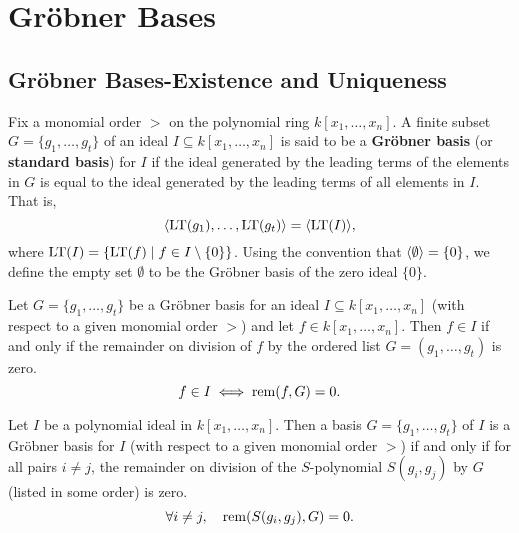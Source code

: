 \chapter{Gr{\"o}bner Bases} 

\section{Gr{\"o}bner Bases-Existence and Uniqueness}

\begin{definition}\label{def:Groebner_basis}
    Fix a monomial order $>$ on the polynomial ring $k[x_1, \dots, x_n]$. A finite subset
    $G = \{g_1, \dots, g_t\}$ of an ideal $I \subseteq k[x_1, \dots, x_n]$ is said to be a
    \textbf{Gr{\"o}bner basis} (or \textbf{standard basis}) for $I$ if the ideal generated by the
    leading terms of the elements in $G$ is equal to the ideal generated by the leading terms
    of all elements in $I$. That is,
    \[ \langle \operatorname{LT}(g_1), \dots, \operatorname{LT}(g_t) \rangle = \langle \operatorname{LT}(I) \rangle, \]
    where $\operatorname{LT}(I) = \{\operatorname{LT}(f) \mid f \in I \setminus \{0\}\}$.
    Using the convention that $\langle \emptyset \rangle = \{0\}$, we define the empty set $\emptyset$
    to be the Gr{\"o}bner basis of the zero ideal $\{0\}$.
\end{definition}

\begin{corollary}\label{cor:GB_membership_test}  %
    Let $G = \{g_1, \dots , g_t\}$ be a Gr{\"o}bner basis for an ideal $I \subseteq k[x_1, \dots , x_n]$
    (with respect to a given monomial order $>$) and let $f \in k[x_1, \dots , x_n]$.
    Then $f \in I$ if and only if the remainder on division of $f$ by the ordered list
    $G = (g_1, \dots, g_t)$ is zero.
    \[ f \in I \iff \operatorname{rem}(f, G) = 0. \]
\end{corollary}

\begin{theorem}\label{def:Buchberger’s Criterion} %
    Let $I$ be a polynomial ideal in $k[x_1, \dots, x_n]$. 
    Then a basis $G = \{g_1, \dots , g_t\}$ of $I$ is a Gr{\"o}bner basis for $I$ (with respect to a given monomial order $>$)
    if and only if for all pairs $i \neq j$, the remainder on division of the $S$-polynomial $S(g_i, g_j)$ by $G$ (listed in some order) is zero.
    \[ \forall i \neq j, \quad \operatorname{rem}(S(g_i, g_j), G) = 0. \]
\end{theorem}

